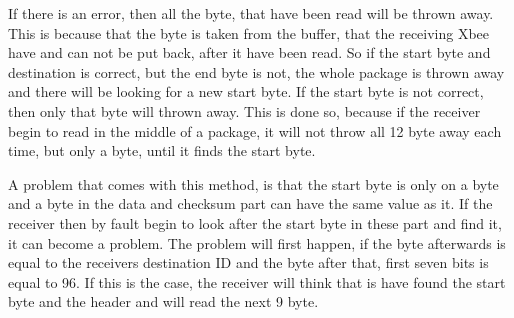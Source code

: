 If there is an error, then all the byte, that have been read will be thrown away. This is because that the byte is taken from the buffer, that the receiving Xbee have and can not be put back, after it have been read. So if the start byte and destination is correct, but the end byte is not, the whole package is thrown away and there will be looking for a new start byte. If the start byte is not correct, then only that byte will thrown away. This is done so, because if the receiver begin to read in the middle of a package, it will not throw all 12 byte away each time, but only a byte, until it finds the start byte.

A problem that comes with this method, is that the start byte is only on a byte and a byte in the data and checksum part can have the same value as it. If the receiver then by fault begin to look after the start byte in these part and find it, it can become a problem. The problem will first happen, if the byte afterwards is equal to the receivers destination ID and the byte after that, first seven bits is equal to 96. If this is the case, the receiver will think that is have found the start byte and the header and will read the next 9 byte. 


